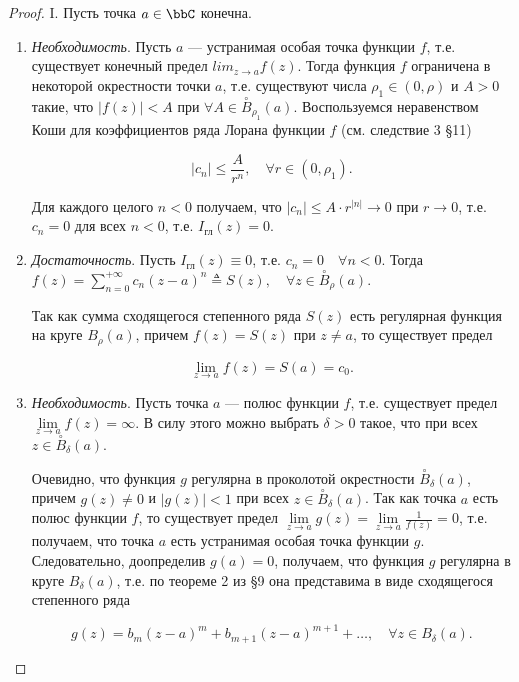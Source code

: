 \begin{proof}

I. Пусть точка $a \in \bbC$ конечна.

\begin{enumerate}

\item \textit{Необходимость}. Пусть $a$ --- устранимая особая точка функции $f$, т.е. существует конечный предел $lim_{z \to a} f(z)$. Тогда функция $f$ ограничена в некоторой окрестности точки $a$, т.е. существуют числа $\rho_1 \in (0, \rho)$ и $A > 0$ такие, что $|f(z)| < A$ при $\forall A \in \overset{\circ}{B}_{\rho_1}(a)$. Воспользуемся неравенством Коши для коэффициентов ряда Лорана функции $f$ (см. следствие 3 \S 11)

$$
|c_n| \le \frac{A}{r^n}, \quad \forall r \in (0, \rho_1).
$$

Для каждого целого $n < 0$ получаем, что $|c_n| \le A \cdot r^{|n|} \to 0$ при $r \to 0$, т.е. $c_n = 0$ для всех $n < 0$, т.е. $I_{\text{гл}}(z) = 0$.

\item \textit{Достаточность}. Пусть $I_{\text{гл}}(z) \equiv 0$, т.е. $c_n = 0 \quad \forall n < 0$. Тогда $f(z) = \sum\limits_{n = 0}^{+\infty} c_n (z - a)^n \triangleq S(z), \quad \forall z \in \overset{\circ}{B}_{\rho}(a)$.

Так как сумма сходящегося степенного ряда $S(z)$ есть регулярная функция на круге $B_\rho(a)$, причем $f(z) = S(z)$ при $z \not= a$, то существует предел

$$
\lim_{z \to a} f(z) = S(a) = c_0.
$$

\item \textit{Необходимость}. Пусть точка $a$ --- полюс функции $f$, т.е. существует предел $\lim\limits_{z \to a} f(z) = \infty$. В силу этого можно выбрать $\delta > 0$ такое, что при всех $z \in \overset{\circ}{B}_{\delta}(a)$.

Очевидно, что функция $g$ регулярна в проколотой окрестности $\overset{\circ}{B}_{\delta}(a)$, причем $g(z) \not= 0$ и $|g(z)| < 1$ при всех $z \in \overset{\circ}{B}_{\delta}(a)$. Так как точка $a$ есть полюс функции $f$, то существует предел $\lim\limits_{z \to a} g(z) = \lim\limits_{z \to a} \frac{1}{f(z)} = 0$, т.е. получаем, что точка $a$ есть устранимая особая точка функции $g$. Следовательно, доопределив $g(a) = 0$, получаем, что функция $g$ регулярна в круге $B_{\delta}(a)$, т.е. по теореме 2 из \S 9 она представима в виде сходящегося степенного ряда

\begin{equation} \label{ch35.2eq3}
g(z) = b_m (z - a)^m + b_{m + 1} (z - a)^{m + 1} + \ldots, \quad \forall z \in B_\delta(a).
\end{equation}


\end{enumerate}
\end{proof}
